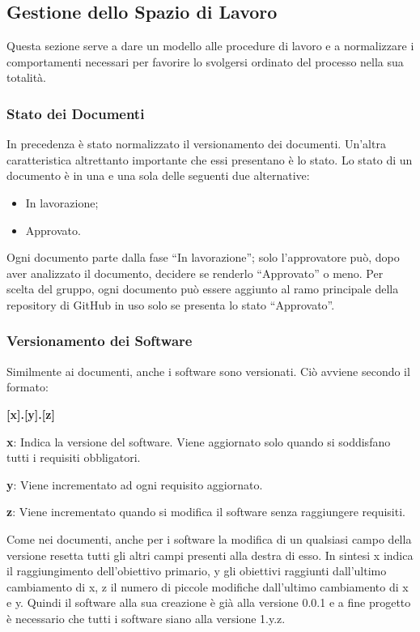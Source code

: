\subsection{Gestione dello Spazio di Lavoro}
Questa sezione serve a dare un modello alle procedure di lavoro e a normalizzare i comportamenti
necessari per favorire lo svolgersi ordinato del processo nella sua totalità.
\subsubsection{Stato dei Documenti}
In precedenza è stato normalizzato il versionamento dei documenti.
Un'altra caratteristica altrettanto importante che essi presentano è lo stato.
Lo stato di un documento è in una e una sola delle seguenti due alternative:
\begin{itemize}
    \item In lavorazione;
    \item Approvato.
\end{itemize}
Ogni documento parte dalla fase ``In lavorazione''; solo l'approvatore può, dopo aver analizzato il 
documento, decidere se renderlo ``Approvato'' o meno. \newline
Per scelta del gruppo, ogni documento può essere aggiunto al ramo principale della repository di GitHub 
in uso solo se presenta lo stato ``Approvato''.
\subsubsection{Versionamento dei Software}
Similmente ai documenti, anche i software sono versionati. Ciò avviene secondo il formato:
\begin{center}
    \textbf{[x].[y].[z]}
\end{center}
\begin{description}
    \item \textbf{x}: Indica la versione del software.
            Viene aggiornato solo quando si soddisfano tutti i requisiti obbligatori. 
    \item \textbf{y}: Viene incrementato ad ogni requisito aggiornato.
    \item \textbf{z}: Viene incrementato quando si modifica il software senza raggiungere requisiti.
\end{description}
Come nei documenti, anche per i software la modifica di un qualsiasi campo della versione resetta tutti gli 
altri campi presenti alla destra di esso. \newline
In sintesi x indica il raggiungimento dell'obiettivo primario, y gli obiettivi raggiunti dall'ultimo cambiamento di x,
z il numero di piccole modifiche dall'ultimo cambiamento di x e y. \newline
Quindi il software alla sua creazione è già alla versione 0.0.1 e a fine progetto è necessario che 
tutti i software siano alla versione 1.y.z.
